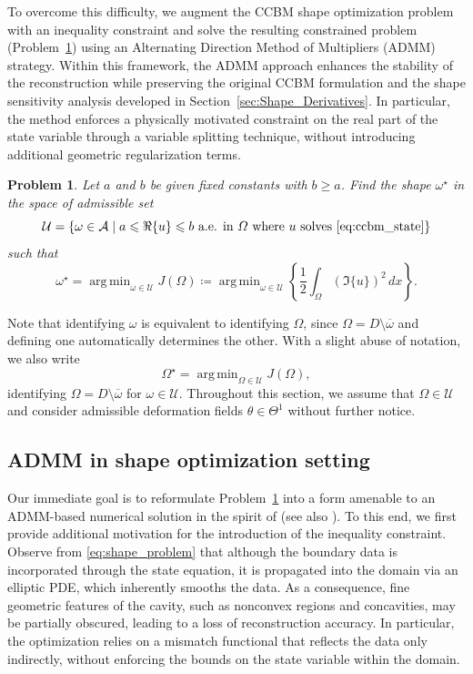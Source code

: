 \documentclass[a4paper,11pt]{article}
\newtheorem{problem}{Problem}
\DeclareMathOperator*{\argmin}{arg\,min}
\newcommand{\sfTheta}{\Theta}
\newcommand{\VV}{\theta}
\newcommand{\intO}[1]{\int_{\varOmega}{#1}{\, {d}{x}}}
\begin{document}
To overcome this difficulty, we augment the CCBM shape optimization problem with an inequality constraint and solve the resulting constrained problem (Problem~\ref{prob:optimal_shape_problem}) using an Alternating Direction Method of Multipliers (ADMM) strategy.
Within this framework, the ADMM approach enhances the stability of the reconstruction while preserving the original CCBM formulation and the shape sensitivity analysis developed in Section~\ref{sec:Shape_Derivatives}.
In particular, the method enforces a physically motivated constraint on the real part of the state variable through a variable splitting technique, without introducing additional geometric regularization terms.
%
%
\begin{problem}\label{prob:optimal_shape_problem}
Let $a$ and $b$ be given fixed constants with $b \geqslant a$.
Find the shape $\omega^{\star}$ in the space of admissible set
\[
	\mathcal{U} = \left\{ \omega \in \mathcal{A} \mid \text{$a \leqslant \Re\{u\} \leqslant b$ a.e. in $\varOmega$ where $u$ solves \eqref{eq:ccbm_state}} \right\}
\]
such that
\begin{equation}\label{eq:control} 
	\omega^{\star} 
	= \argmin_{\omega \in \mathcal{U}} J({\varOmega})
	\coloneqq \argmin_{\omega \in \mathcal{U}} \left\{ \frac{1}{2} \intO{ \left( \Im\{u\} \right)^{2} } \right\}.
\end{equation}	
\end{problem}
Note that identifying $\omega$ is equivalent to identifying $\varOmega$, since $\varOmega = D \setminus \overline{\omega}$ and defining one automatically determines the other.
With a slight abuse of notation, we also write
\[
\varOmega^{\star} = \argmin_{\varOmega \in \mathcal{U}} J(\varOmega),
\]
identifying $\varOmega = D \setminus \overline{\omega}$ for $\omega \in \mathcal{U}$.
Throughout this section, we assume that $\varOmega \in \mathcal{U}$ and consider admissible deformation fields $\VV \in \sfTheta^{1}$ without further notice.
\subsection{ADMM in shape optimization setting}
\label{subsec:ADMM_algorithm}
Our immediate goal is to reformulate Problem~\ref{prob:optimal_shape_problem} into a form amenable to an ADMM-based numerical solution in the spirit of  \cite{CherratAfraitesRabago2026} (see also \cite{RabagoHadriAfraitesHendyZaky2024,CherratAfraitesRabago2025b}).
To this end, we first provide additional motivation for the introduction of the inequality constraint.
Observe from \eqref{eq:shape_problem} that although the boundary data is incorporated through the state equation, it is propagated into the domain via an elliptic PDE, which inherently smooths the data.
As a consequence, fine geometric features of the cavity, such as nonconvex regions and concavities, may be partially obscured, leading to a loss of reconstruction accuracy.
In particular, the optimization relies on a mismatch functional that reflects the data only indirectly, without enforcing the bounds on the state variable within the domain.
\end{document}
